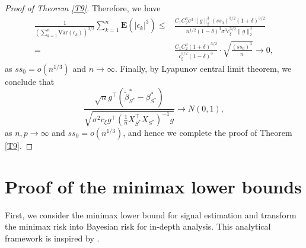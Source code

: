 \documentclass[12pt]{article}
\newtheorem{proof}{Proof}
\begin{document}
\begin{appendix}
\begin{proof}[Proof of Theorem \ref{T9}]
Therefore, we have 
\begin{equation}
\begin{aligned}
\frac{1}{\left ( \sum_{k=1}^n\text{Var} \left( \epsilon_k \right) \right )^{3/2} }
\sum_{k=1}^n \mathbf E\left( |\epsilon_k|^3 \right)
\le & \frac{C_1 C_2^3 \sigma^3 \| g\|_2^3 (ss_0)^{3/2} (1+\delta)^{3/2}}
{n^{1/2} (1-\delta)^3 \sigma^3 c_\xi^{3/2} \|g\|_2^3  }\\
=& \frac{C_1 C_2^3   (1+\delta)^{3/2} }
{c_\xi^{3/2} (1-\delta)^3 } \cdot \sqrt{\frac{(ss_0)^3}{n}} 
\to 0,
\end{aligned}
\end{equation}
as $ss_0 = o(n^{1/3})$ and $n\to \infty$.
Finally, by Lyapunov central limit theorem, we conclude that 
$$
\frac{\sqrt n g^\top (\tilde\beta^*_{S^*} - \beta^*_{S^*})}
{\sqrt{\sigma^2 c_\xi g^\top \left( \frac1n X_{S^*}^\top X_{S^*} \right)^{-1} g }} \to N(0,1),
$$
as $n, p \to \infty$ and $ss_0 = o(n^{1/3})$, and hence we complete the proof of Theorem \ref{T9}. 
\end{proof}

\section{Proof of the minimax lower bounds}\label{lowerproof}
First, we consider the minimax lower bound for signal estimation and transform the minimax risk into Bayesian risk for in-depth analysis. This analytical framework is inspired by \cite{MN19}.


\end{appendix}
\end{document}
